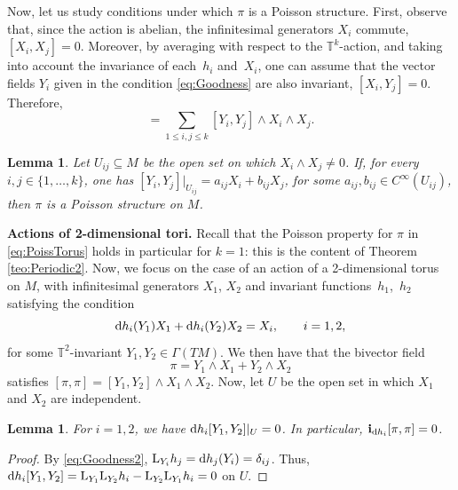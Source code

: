 \documentclass[pdftex]{sigma}%
\newcommand{\dd}{{\rm d}}
\newcommand{\ii}{\mathbf{i}}
\numberwithin{equation}{section}
\newtheorem{Lemma}[Theorem]{Lemma}
\begin{document}
Now, let us study conditions under which $\pi$ is a Poisson structure. First, observe that, since the action is abelian, the infinitesimal generators $X_{i}$ commute, $[X_{i},X_{j}] = 0$. Moreover, by averaging with respect to the $\mathbb{T}^{k}$-action, and taking into account the invariance of each~$h_i$ and~$X_i$, one can assume that the vector fields $Y_{i}$ given in the condition \eqref{eq:Goodness} are also invariant, $[X_{i},Y_{j}] = 0$. Therefore,
 \begin{equation*}
 [\pi,\pi] = \sum_{1 \leq i,j \leq k}[Y_i,Y_{j}]\wedge X_{i}\wedge X_{j}.
 \end{equation*}

\begin{Lemma}\label{lemma:PoissToric1}
Let $U_{ij} \subseteq M$ be the open set on which $X_{i} \wedge X_{j} \neq 0$. If, for every $i,j \in \{1,\dots,k\}$, one has $[Y_{i},Y_{j}]|_{U_{ij}} = a_{ij}X_{i} + b_{ij}X_{j}$, for some $a_{ij},b_{ij} \in C^{\infty}(U_{ij})$, then $\pi$ is a Poisson structure on $M$.
\end{Lemma}

{\bf Actions of 2-dimensional tori.} Recall that the Poisson property for $\pi$ in \eqref{eq:PoissTorus} holds in particular for $k=1$: this is the content of Theorem \ref{teo:Periodic2}. Now, we focus on the case of an action of a 2-dimensional torus on $M$, with infinitesimal generators $X_1$, $X_2$ and invariant functi\-ons~$h_1$,~$h_2$ satisfying the condition
 \begin{equation}\label{eq:Goodness2}
 \dd h_{i}(Y_{1})X_{1} + \dd h_{i}(Y_{2})X_{2} = X_{i}, \qquad i = 1, 2,
 \end{equation}
for some $\mathbb{T}^2$-invariant $Y_1,Y_2 \in \Gamma(TM)$. We then have that the bivector field
 \begin{equation}\label{eq:PoissTorus2}
 \pi = Y_1\wedge X_1 + Y_2\wedge X_2
 \end{equation}
satisfies $[\pi,\pi] = [Y_1,Y_2] \wedge X_1 \wedge X_2$.
Now, let $U$ be the open set in which $X_{1}$ and $X_{2}$ are independent.

\begin{Lemma}\label{lemma:PoissToric2}
For $i = 1,2$, we have $\dd h_{i}[Y_{1},Y_{2}]|_{U} = 0$. In particular, $\ii_{\dd h_{i}}[\pi,\pi] = 0$.
\end{Lemma}
\begin{proof}
By \eqref{eq:Goodness2}, ${\rm L}_{Y_{i}}h_{j} = \dd h_{j}(Y_{i}) = \delta_{ij}$. Thus, $\dd h_{i}[Y_{1},Y_{2}] = {\rm L}_{Y_{1}}{\rm L}_{Y_{2}}h_{i} - {\rm L}_{Y_{2}}{\rm L}_{Y_{1}}h_{i} = 0$ on $U$.
\end{proof}
\end{document}
